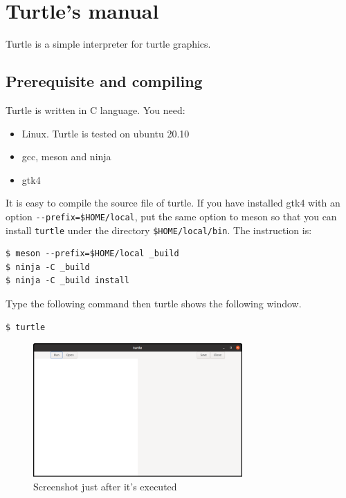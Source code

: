 \hypertarget{turtles-manual}{%
\section{Turtle's manual}\label{turtles-manual}}

Turtle is a simple interpreter for turtle graphics.

\hypertarget{prerequisite-and-compiling}{%
\subsection{Prerequisite and
compiling}\label{prerequisite-and-compiling}}

Turtle is written in C language. You need:

\begin{itemize}
\tightlist
\item
  Linux. Turtle is tested on ubuntu 20.10
\item
  gcc, meson and ninja
\item
  gtk4
\end{itemize}

It is easy to compile the source file of turtle. If you have installed
gtk4 with an option \passthrough{\lstinline!--prefix=$HOME/local!}, put
the same option to meson so that you can install
\passthrough{\lstinline!turtle!} under the directory
\passthrough{\lstinline!$HOME/local/bin!}. The instruction is:

\begin{lstlisting}
$ meson --prefix=$HOME/local _build
$ ninja -C _build
$ ninja -C _build install
\end{lstlisting}

Type the following command then turtle shows the following window.

\begin{lstlisting}
$ turtle
\end{lstlisting}

\begin{figure}
\centering
\includegraphics[width=8cm,height=5.11cm]{../src/turtle/image/turtle1.png}
\caption{Screenshot just after it's executed}
\end{figure}

